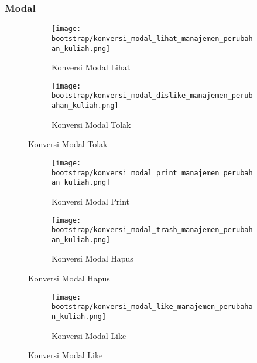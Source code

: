\subsubsection{Modal}
\begin{figure}	
	\centering
	\begin{subfigure}[t]{3in}
		\centering  
		\texttt{[image: bootstrap/konversi\_modal\_lihat\_manajemen\_perubahan\_kuliah.png]}
		\caption{Konversi Modal Lihat} 
	\end{subfigure}
	\quad
	\begin{subfigure}[t]{3in}
		\centering  
		\texttt{[image: bootstrap/konversi\_modal\_dislike\_manajemen\_perubahan\_kuliah.png]}
		\caption{Konversi Modal Tolak} 
	\end{subfigure}
\end{figure}
\begin{figure}	
	\centering
	\begin{subfigure}[t]{3in}
		\centering  
		\texttt{[image: bootstrap/konversi\_modal\_print\_manajemen\_perubahan\_kuliah.png]}
		\caption{Konversi Modal Print} 
	\end{subfigure}
	\quad
	\begin{subfigure}[t]{3in}
		\centering  
		\texttt{[image: bootstrap/konversi\_modal\_trash\_manajemen\_perubahan\_kuliah.png]}
		\caption{Konversi Modal Hapus} 
	\end{subfigure}
\end{figure}
\begin{figure}	
	\centering
	\begin{subfigure}[t]{3in}
		\centering  
		\texttt{[image: bootstrap/konversi\_modal\_like\_manajemen\_perubahan\_kuliah.png]}
		\caption{Konversi Modal Like} 
	\end{subfigure}
\end{figure}
